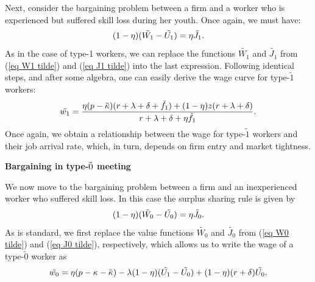 \documentclass[12pt]{article} %
\theoremstyle{definition}
\begin{document}
\noindent Next, consider the bargaining problem between a firm and a worker who is experienced but suffered skill loss during her youth. Once again, we must have:
\begin{equation}
    (1-\eta)(\Tilde{W_1}-\Tilde{U_1}) = \eta \Tilde{J_1}. \nonumber  
\end{equation}As in the case of type-1 workers, we can replace the functions $\tilde{W_1}$ and $\tilde{J_1}$ from (\ref{eq W1 tilde}) and (\ref{eq J1 tilde}) into the last expression. Following identical steps, and after some algebra, one can easily derive the wage curve for type-$\tilde{1}$ workers: 
\begin{equation}
\Tilde{w_1} = \frac{\eta (p-\Tilde{\kappa}) (r+\lambda+\delta+\Tilde{f_1})+(1-\eta)z(r+\lambda+\delta)}{r+\lambda+\delta + \eta \Tilde{f_1}}. \label{eq WC1 tilde}
\end{equation}Once again, we obtain a relationship between the wage for type-$\tilde{1}$ workers and their job arrival rate, which, in turn, depends on firm entry and market tightness. 


\bigskip


\noindent \textbf{Bargaining in type-$\Tilde{0}$ meeting}

\medskip 

\noindent We now move to the bargaining problem between a firm and an inexperienced worker who suffered skill loss. In this case the surplus sharing rule is given by 
\begin{equation}
       (1-\eta)(\Tilde{W_0}-\Tilde{U_0}) = \eta \Tilde{J_0}.  \nonumber 
       \end{equation}As is standard, we first replace the value functions $\tilde{W_0}$ and $\tilde{J_0}$ from (\ref{eq W0 tilde}) and (\ref{eq J0 tilde}), respectively, which allows us to write the wage of a type-$\tilde{0}$ worker as
\begin{equation}
    \Tilde{w_0} = \eta (p-\kappa-\Tilde{\kappa})  - \lambda (1-\eta)(\Tilde{U_1} - \Tilde{U_0}) + (1-\eta)(r+\delta) \Tilde{U_0}. \label{eq w0 tilde first step}
    \end{equation}
    
\end{document}
